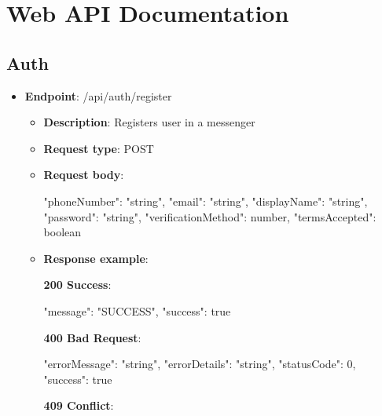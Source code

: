 \chapter{Web API Documentation}\label{ch:web-api-documentation}


\section{Auth}\label{sec:auth}
\begin{itemize}
    \item \textbf{Endpoint}: /api/auth/register
    \begin{itemize}
        \item \textbf{Description}: Registers user in a messenger
        \item \textbf{Request type}: POST
        \item \textbf{Request body}:
        \begin{spverbatim}
        {
            "phoneNumber": "string",
            "email": "string",
            "displayName": "string",
            "password": "string",
            "verificationMethod": number,
            "termsAccepted": boolean
        }
        \end{spverbatim}
        \item  \textbf{Response example}:

        \textbf{200 Success}:

        \begin{spverbatim}
        {
            "message": "SUCCESS",
            "success": true
        }
        \end{spverbatim}

        \textbf{400 Bad Request}:

        \begin{spverbatim}
        {
            "errorMessage": "string",
            "errorDetails": "string",
            "statusCode": 0,
            "success": true
        }
        \end{spverbatim}

        \textbf{409 Conflict}:


\end{itemize}
\end{itemize}
